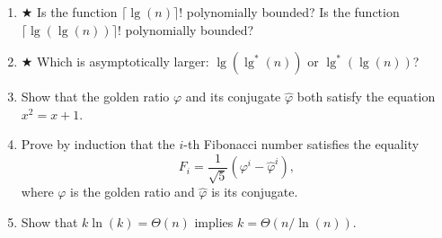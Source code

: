 \documentclass[Chapter03]{subfiles}
\begin{document}
\begin{enumerate}[leftmargin=\labelsep]
		\item $\bigstar$ Is the function $\lceil \lg(n) \rceil !$ polynomially bounded? Is the function $\lceil \lg(\lg(n)) \rceil !$ polynomially bounded?
		\begin{answer}
			
		\end{answer}

		\item $\bigstar$ Which is asymptotically larger: $\lg(\lg^*(n))$ or $\lg^*(\lg(n))$?
		\begin{answer}
			
		\end{answer}

		\item Show that the golden ratio $\varphi$ and its conjugate $\hat\varphi$ both satisfy the equation $x^2 = x + 1$.
		\begin{answer}
			
		\end{answer}

		\item Prove by induction that the $i$-th Fibonacci number satisfies the equality
		\[
			F_i = \frac{1}{\sqrt{5}}(\varphi^i - \hat\varphi^i),
		\]
		where $\varphi$ is the golden ratio and $\hat\varphi$ is its conjugate.
		\begin{answer}
			
		\end{answer}

		\item Show that $k\ln(k) = \Theta(n)$ implies $k = \Theta(n / \ln(n))$.
		\begin{answer}
			
		\end{answer}

	\end{enumerate}
\end{document}
